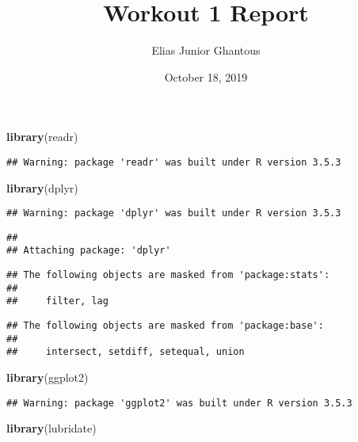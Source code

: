 \documentclass[]{article}
\title{Workout 1 Report}
\author{Elias Junior Ghantous}
\date{October 18, 2019}
\newenvironment{Shaded}{\begin{snugshade}}{\end{snugshade}}
\newcommand{\KeywordTok}[1]{\textcolor[rgb]{0.13,0.29,0.53}{\textbf{#1}}}
\newcommand{\NormalTok}[1]{#1}
\begin{document}
\maketitle

\begin{Shaded}
\begin{Highlighting}[]
\KeywordTok{library}\NormalTok{(readr)}
\end{Highlighting}
\end{Shaded}

\begin{verbatim}
## Warning: package 'readr' was built under R version 3.5.3
\end{verbatim}

\begin{Shaded}
\begin{Highlighting}[]
\KeywordTok{library}\NormalTok{(dplyr)}
\end{Highlighting}
\end{Shaded}

\begin{verbatim}
## Warning: package 'dplyr' was built under R version 3.5.3
\end{verbatim}

\begin{verbatim}
## 
## Attaching package: 'dplyr'
\end{verbatim}

\begin{verbatim}
## The following objects are masked from 'package:stats':
## 
##     filter, lag
\end{verbatim}

\begin{verbatim}
## The following objects are masked from 'package:base':
## 
##     intersect, setdiff, setequal, union
\end{verbatim}

\begin{Shaded}
\begin{Highlighting}[]
\KeywordTok{library}\NormalTok{(ggplot2)}
\end{Highlighting}
\end{Shaded}

\begin{verbatim}
## Warning: package 'ggplot2' was built under R version 3.5.3
\end{verbatim}

\begin{Shaded}
\begin{Highlighting}[]
\KeywordTok{library}\NormalTok{(lubridate)}
\end{Highlighting}
\end{Shaded}
\end{document}

